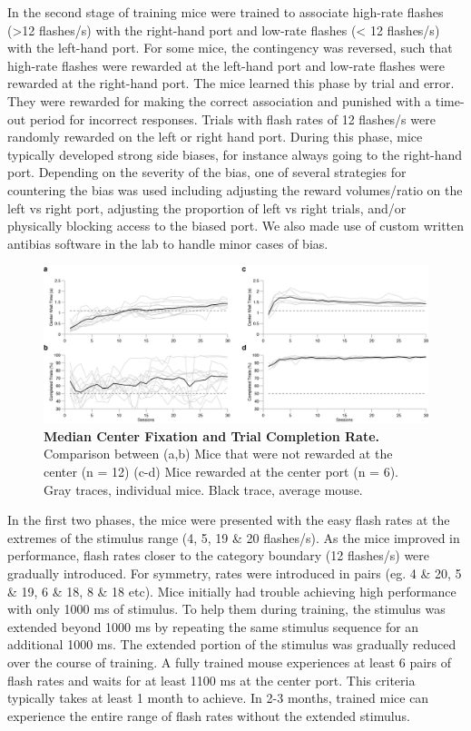 In the second stage of training mice were trained to associate high-rate flashes (>12 flashes/s) with the right-hand port and low-rate flashes (< 12 flashes/s) with the left-hand port. For some mice, the contingency was reversed, such that high-rate flashes were rewarded at the left-hand port and low-rate flashes were rewarded at the right-hand port. The mice learned this phase by trial and error. They were rewarded for making the correct association and punished with a time-out period for incorrect responses. Trials with flash rates of 12 flashes/s were randomly rewarded on the left or right hand port. During this phase, mice typically developed strong side biases, for instance always going to the right-hand port. Depending on the severity of the bias, one of several strategies for countering the bias was used including adjusting the reward volumes/ratio on the left vs right port, adjusting the proportion of left vs right trials, and/or physically blocking access to the biased port. We also made use of custom written antibias software in the lab to handle minor cases of bias. \par 
\begin{figure}
  \centering
  	\includegraphics[width=\textwidth]{Figures/chapter2/CenterWaitTimeandCompletionRateComparison.png}
  \caption[Median Center Wait Duration and Trial Completion Rate]{\textbf{Median Center Fixation and Trial Completion Rate.} Comparison between (a,b) Mice that were not rewarded at the center (n = 12) (c-d) Mice rewarded at the center port (n = 6). Gray traces, individual mice. Black trace, average mouse.}
   \label{fig:completeRate}
\end{figure}
In the first two phases, the mice were presented with the easy flash rates at the extremes of the stimulus range (4, 5, 19 \& 20 flashes/s). As the mice improved in performance,  flash rates closer to the category boundary (12 flashes/s) were gradually introduced. For symmetry, rates were introduced in pairs (eg. 4 \& 20, 5 \& 19, 6 \& 18, 8 \& 18 etc). Mice initially had trouble achieving high performance with only 1000 ms of stimulus. To help them during training, the stimulus was extended beyond 1000 ms by repeating the same stimulus sequence for an additional 1000 ms. The extended portion of the stimulus was gradually reduced over the course of training. A fully trained mouse experiences at least 6 pairs of flash rates and waits for at least 1100 ms at the center port. This criteria typically takes at least 1 month to achieve. In 2-3 months, trained mice can experience the entire range of flash rates without the extended stimulus.
